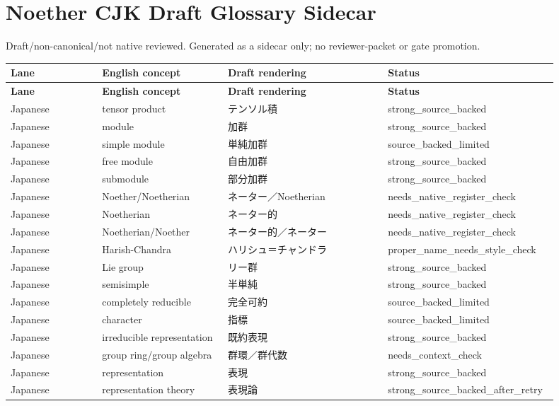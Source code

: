 \documentclass{article}
\begin{document}
\section*{Noether CJK Draft Glossary Sidecar}
Draft/non-canonical/not native reviewed. Generated as a sidecar only; no reviewer-packet or gate promotion.
\begin{longtable}{p{0.16\linewidth}p{0.22\linewidth}p{0.28\linewidth}p{0.24\linewidth}}
\textbf{Lane} & \textbf{English concept} & \textbf{Draft rendering} & \textbf{Status}\\\hline
\endfirsthead
\textbf{Lane} & \textbf{English concept} & \textbf{Draft rendering} & \textbf{Status}\\\hline
\endhead
Japanese & tensor product & テンソル積 & strong\_source\_backed \\
Japanese & module & 加群 & strong\_source\_backed \\
Japanese & simple module & 単純加群 & source\_backed\_limited \\
Japanese & free module & 自由加群 & strong\_source\_backed \\
Japanese & submodule & 部分加群 & strong\_source\_backed \\
Japanese & Noether/Noetherian & ネーター／Noetherian & needs\_native\_register\_check \\
Japanese & Noetherian & ネーター的 & needs\_native\_register\_check \\
Japanese & Noetherian/Noether & ネーター的／ネーター & needs\_native\_register\_check \\
Japanese & Harish-Chandra & ハリシュ＝チャンドラ & proper\_name\_needs\_style\_check \\
Japanese & Lie group & リー群 & strong\_source\_backed \\
Japanese & semisimple & 半単純 & strong\_source\_backed \\
Japanese & completely reducible & 完全可約 & source\_backed\_limited \\
Japanese & character & 指標 & source\_backed\_limited \\
Japanese & irreducible representation & 既約表現 & strong\_source\_backed \\
Japanese & group ring/group algebra & 群環／群代数 & needs\_context\_check \\
Japanese & representation & 表現 & strong\_source\_backed \\
Japanese & representation theory & 表現論 & strong\_source\_backed\_after\_retry \\

\end{longtable}
\end{document}
